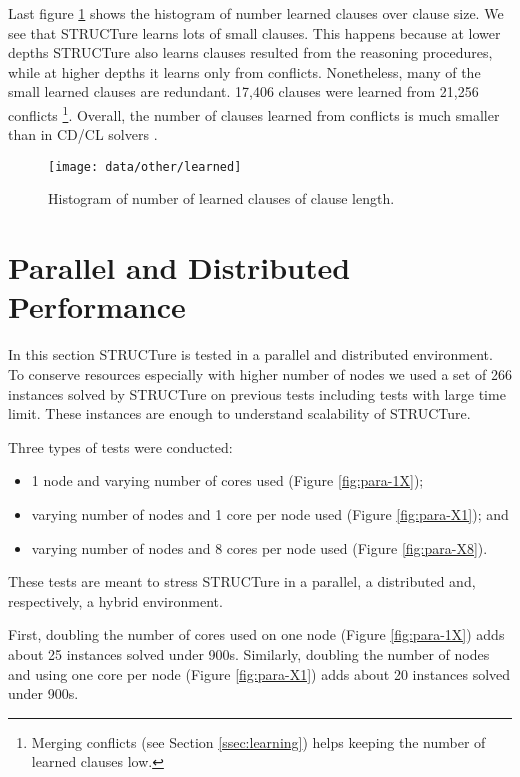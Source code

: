 Last figure \ref{fig:num-learned} shows the histogram of number
learned clauses over clause size. We see that STRUCTure learns lots
of small clauses. This happens because at lower depths STRUCTure
also learns clauses resulted from the reasoning procedures, while
at higher depths it learns only from conflicts. Nonetheless, many of
the small learned clauses are redundant. 17,406 clauses were learned
from 21,256 conflicts \footnote{Merging conflicts (see Section
\ref{ssec:learning}) helps keeping the number of learned clauses
low.}. Overall, the number of clauses learned from conflicts is much
smaller than in CD/CL solvers \cite{Marques-silva99grasp:a}.


\begin{figure}
  \centering
  \texttt{[image: data/other/learned]}
  \caption{Histogram of number of learned clauses of clause length.}
  \label{fig:num-learned}
\end{figure}



\section{Parallel and Distributed Performance}

In this section STRUCTure is tested in a parallel and distributed
environment. To conserve resources especially with higher number
of nodes we used a set of 266 instances solved by STRUCTure on
previous tests including tests with large time limit. These instances
are enough to understand scalability of STRUCTure.

Three types of tests were conducted:
\begin{itemize}
  \item 1 node and varying number of cores used (Figure \ref{fig:para-1X});
  \item varying number of nodes and 1 core per node used (Figure \ref{fig:para-X1}); and
  \item varying number of nodes and 8 cores per node used (Figure \ref{fig:para-X8}).
\end{itemize}
These tests are meant to stress STRUCTure in a parallel, a distributed
and, respectively, a hybrid environment.

First, doubling the number of cores used on one node (Figure
\ref{fig:para-1X}) adds about 25 instances solved under 900s.
Similarly, doubling the number of nodes and using one core per node
(Figure \ref{fig:para-X1}) adds about 20 instances solved under 900s.

